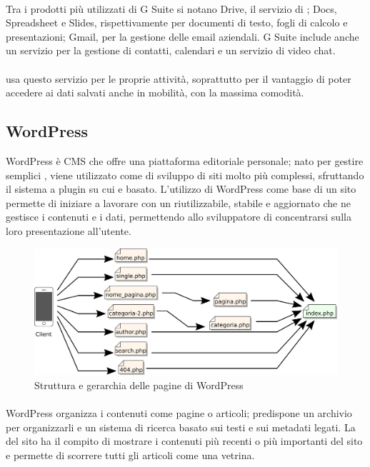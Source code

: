   \paragraph*{} Tra i prodotti più utilizzati di G Suite si notano Drive, il servizio di ; Docs, Spreadsheet e Slides, rispettivamente per documenti di testo, fogli di calcolo e presentazioni; Gmail, per la gestione delle email aziendali. G Suite include anche un servizio per la gestione di contatti, calendari e un servizio di video chat.
   \paragraph*{}
   \nomeAzienda{} usa questo servizio per le proprie attività, soprattutto per il vantaggio di poter accedere ai dati salvati anche in mobilità, con la massima comodità.

   \subsection{WordPress}
   WordPress è \gls{CMS}  che offre una piattaforma editoriale personale; nato per gestire semplici , viene utilizzato come  di sviluppo di siti molto più complessi, sfruttando il sistema a plugin su cui e basato. L'utilizzo di WordPress come base di un sito permette di iniziare a lavorare con un  riutilizzabile, stabile e aggiornato che ne gestisce i contenuti e i dati, permettendo allo sviluppatore di concentrarsi sulla loro presentazione all'utente.

   \begin{figure}[H]
      \begin{center}
         \includegraphics[width=16.5cm,keepaspectratio]{immagini/wordpress-schema}
         \caption{Struttura e gerarchia delle pagine di WordPress}
      \end{center}
   \end{figure}
   \paragraph*{} WordPress organizza i contenuti come pagine o articoli; predispone un archivio per organizzarli e un sistema di ricerca basato sui testi e sui metadati legati. La  del sito ha il compito di mostrare i contenuti più recenti o più importanti del sito e permette di scorrere tutti gli articoli come una vetrina.

